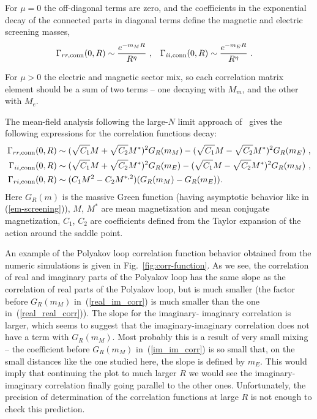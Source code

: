 \documentclass[a4paper,11pt]{article}
\begin{document}
For $\mu = 0$ the off-diagonal terms are zero, 
and the coefficients in the exponential decay of the connected parts in diagonal terms define the magnetic and electric screening masses,
\begin{align}
\label{em-screening}
\Gamma_{rr, \rm conn}(0, R) &\sim \frac{e^{-m_M R}}{R^\eta} \ , & \Gamma_{ii, \rm conn}(0, R) &\sim \frac{e^{-m_E R}}{R^\eta} \ .
\end{align}

For $\mu > 0$ the electric and magnetic sector mix, so 
each correlation matrix element should be a sum of two terms
-- one decaying with $M_m$, and the other with $M_e$. 

The mean-field analysis following the large-$N$ limit approach of~\cite{thooft-veneziano-limit} gives the following expressions for the correlation functions decay:
\begin{align}
\label{real_real_corr}
\Gamma_{rr, \rm conn}(0, R) &\sim  
 ( \sqrt{C_1} M + \sqrt{C_2} M^*)^2 G_R(m_M)  - ( \sqrt{C_1} M - \sqrt{C_2} M^*)^2 G_R(m_E) \ , \\
\label{im_im_corr}
\Gamma_{ii, \rm conn}(0, R) &\sim
 ( \sqrt{C_1} M + \sqrt{C_2} M^*)^2 G_R(m_E)  - ( \sqrt{C_1} M - \sqrt{C_2} M^*)^2 G_R(m_M) \ , \\
\label{real_im_corr}
\Gamma_{ri, \rm conn}(0, R) &\sim
 ( C_1 M^2 - C_2 M^{*,2}) (G_R(m_M) - G_R(m_E)) . 
\end{align}
Here $G_R(m)$ is the massive Green function (having asymptotic behavior like in (\ref{em-screening})), 
$M$, $M^*$ are mean magnetization and mean conjugate magnetization, $C_1$, $C_2$ are coefficients defined from the Taylor expansion of the action around the saddle point. 

An example of the Polyakov loop correlation function behavior
obtained from the numeric simulations is given in Fig.~\ref{fig:corr-function}. As we see,
the correlation of real and imaginary parts of the Polyakov loop has the same slope as the correlation of real parts of the Polyakov loop, but is much smaller (the factor before $G_R(m_M)$ in~(\ref{real_im_corr}) is much smaller than the one in~(\ref{real_real_corr})). The slope for the imaginary-
imaginary correlation is larger, which seems to suggest 
that the imaginary-imaginary correlation does not have a term 
with $G_R(m_M)$. Most probably this is a result of very small mixing -- the coefficient before $G_R(m_M)$ in~(\ref{im_im_corr}) is so small that, on the small distances like the one studied here, the slope is defined by $m_E$. 
This would imply that continuing the plot to much larger 
$R$ we would see the imaginary-imaginary correlation finally going parallel to the other ones. Unfortunately, the precision of determination of the correlation functions at large $R$ is not enough to check this prediction.
\end{document}
